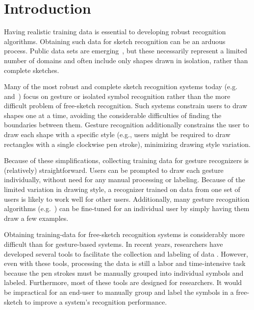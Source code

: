 \documentclass[final,5p,twocolumn]{elsarticle}
\begin{document}
\section{Introduction}
Having realistic training data is essential to developing robust
recognition algorithms.  Obtaining such data for sketch recognition 
can be an arduous process. Public data sets are
emerging~\cite{Oltmans2004ETCHASketch,Hse2005Recognition,
  Wolin2007Labeler,Paulson2008SOUSA,Blagojevic2008Data}, but these
necessarily represent a limited number of domains and often include
only shapes drawn in isolation, rather than complete sketches.

Many of the most robust and complete sketch recognition systems today
(e.g. \cite{Zeleznik2008Lineogrammer} and~\cite{Lee2008Newton}) focus
on gesture or isolated symbol recognition rather than the more
difficult problem of free-sketch recognition.  Such systems constrain
users to draw shapes one at a time, avoiding the considerable
difficulties of finding the boundaries between them.  Gesture
recognition additionally constrains the user to draw each shape
with a specific style (e.g., users might be required to draw
rectangles with a single clockwise pen stroke), minimizing drawing
style variation.

Because of these simplifications, collecting training data for gesture
recognizers is (relatively) straightforward.  Users can be prompted to
draw each gesture individually, without need for any manual processing
or labeling.  Because of the limited variation in drawing style, a
recognizer trained on data from one set of users is likely to work
well for other users. Additionally, many gesture recognition
algorithms (e.g.~\cite{dollar}) can be fine-tuned for an individual
user by simply having them draw a few examples.

Obtaining training-data for free-sketch recognition systems is
considerably more difficult than for gesture-based systems. In recent
years, researchers have developed several tools to facilitate the
collection and labeling of data
\cite{Wolin2007Labeler,Paulson2008SOUSA,Blagojevic2008Data}.  However,
even with these tools, processing the data is still a labor and
time-intensive task because the pen strokes must be manually grouped
into individual symbols and labeled.  Furthermore, most of these tools
are designed for researchers. It would be impractical for an end-user
to manually group and label the symbols in a free-sketch to improve a
system's recognition performance.
\end{document}
